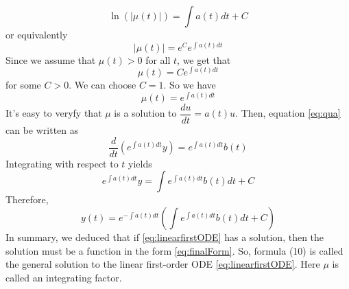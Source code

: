 \documentclass[main.tex]{subfiles}
\begin{document}
\begin{equation}
    \ln(|\mu(t)|) = \int a(t) dt + C
\end{equation}
or equivalently 
\begin{equation}
    |\mu(t)| = e^C e^{\int a(t) dt}
\end{equation}
 Since we assume that $\mu(t) > 0$ for all $t$, we get that 
\begin{equation}
    \mu(t) = C e^{\int a(t) dt}
\end{equation}
for some $C > 0$. We can choose $C = 1$. So we have 
\begin{equation}
    \mu(t) = e^{\int a(t) dt}
\end{equation}
 It's easy to veryfy that $\mu$ is a solution to $\dfrac{du}{dt} = a(t) u$. 
 Then, equation \ref{eq:qua} can be written as 
\begin{equation}
    \dfrac{d}{dt} (e^{\int a(t) dt} y) = e^{\int a(t) dt} b(t)
\end{equation}
Integrating with respect to $t$ yields 
\begin{equation}
    e^{\int a(t) dt} y = \int e^{\int a(t) dt} b(t) dt + C
\end{equation}
Therefore, 
\begin{equation}\label{eq:finalForm}
    y(t) = e^{-\int a(t) dt} (\int e^{\int a(t) dt} b(t) dt + C)
\end{equation}
In summary, we deduced that if \ref{eq:linearfirstODE} has a solution, then the solution must be a function in the form \ref{eq:finalForm}. So, formula (10) is called the general solution to the linear first-order ODE \ref{eq:linearfirstODE}. Here $\mu$ is called an integrating factor. 
\end{document}
